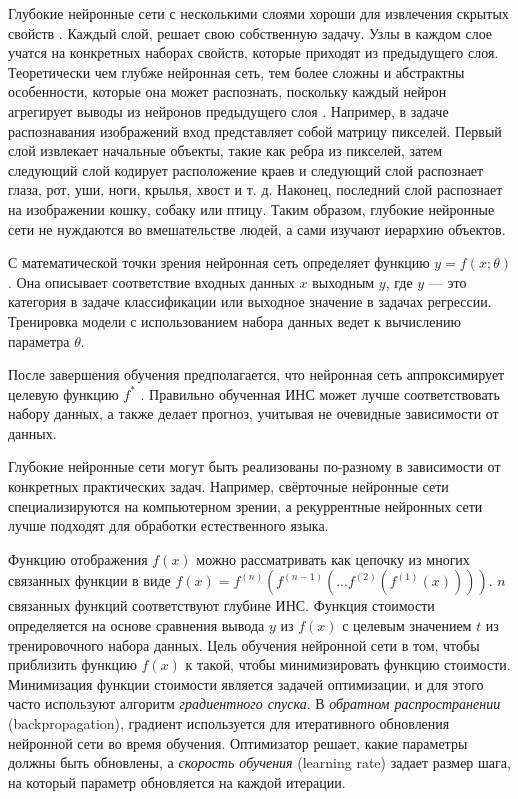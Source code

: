 Глубокие нейронные сети с несколькими слоями хороши для извлечения скрытых свойств \cite{7344858}. Каждый слой, решает свою собственную задачу. Узлы в каждом слое учатся на конкретных наборах свойств, которые приходят из предыдущего слоя. Теоретически чем глубже нейронная сеть, тем более сложны и абстрактны особенности, которые она может распознать, поскольку каждый нейрон агрегирует выводы из нейронов предыдущего слоя \cite{bengio2012representation}. Например, в задаче распознавания изображений вход представляет собой матрицу пикселей. Первый слой извлекает начальные объекты, такие как ребра из пикселей, затем следующий слой кодирует расположение краев и следующий слой распознает глаза, рот, уши, ноги, крылья, хвост и т. д. Наконец, последний слой распознает на изображении кошку, собаку или птицу. Таким образом, глубокие нейронные сети не нуждаются во вмешательстве людей, а сами изучают иерархию объектов.

С математической точки зрения нейронная сеть определяет функцию ${y = f(x; \theta)}$. Она описывает соответствие входных данных ${x}$ выходным ${y}$, где ${y}$ --- это категория в задаче классификации или выходное значение в задачах регрессии. Тренировка модели с использованием набора данных ведет к вычислению параметра {$\theta$}.

После завершения обучения предполагается, что нейронная сеть аппроксимирует целевую функцию ${f^*}$ \cite{Goodfellow-et-al-2016}. Правильно обученная ИНС может лучше соответствовать набору данных, а также делает прогноз, учитывая не очевидные зависимости от данных. 

Глубокие нейронные сети могут быть реализованы по-разному в зависимости от конкретных практических задач. Например, свёрточные нейронные сети специализируются на компьютерном зрении, а рекуррентные нейронных сети лучше подходят для обработки естественного языка.

Функцию отображения ${f(x)}$ можно рассматривать как цепочку из многих связанных функции в виде  ${f(x) = f^{(n)}(f^{(n-1)}(...f^{(2)}(f^{(1)}(x))))}$. ${n}$ связанных функций соответствуют глубине ИНС. Функция стоимости определяется на основе сравнения вывода ${y}$ из ${f(x)}$ с целевым значением ${t}$ из тренировочного набора данных. Цель обучения нейронной сети в том, чтобы приблизить функцию ${f(x)}$ к такой, чтобы минимизировать функцию стоимости. Минимизация функции стоимости является задачей оптимизации, и для этого часто используют алгоритм {\itshape градиентного спуска}. В {\itshape обратном распространении} (backpropagation), градиент используется для итеративного обновления нейронной сети во время обучения. Оптимизатор решает, какие параметры должны быть обновлены, а {\itshape скорость обучения} (learning rate) задает размер шага, на который параметр обновляется на каждой итерации.

